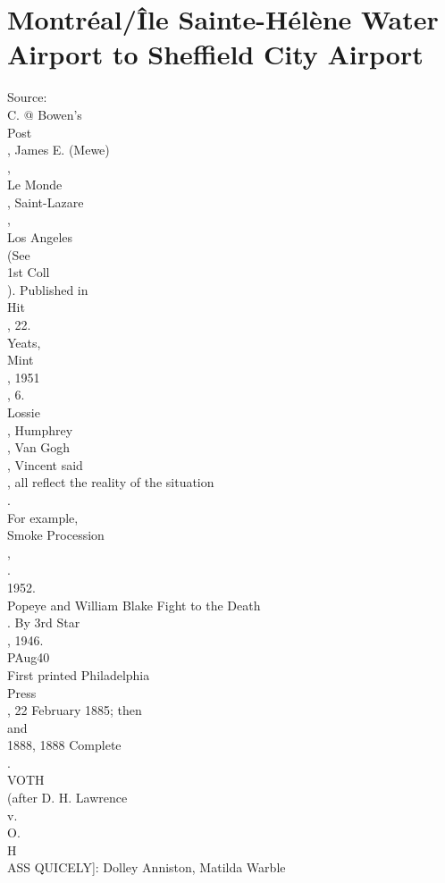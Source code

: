 \documentclass[smalldemyvopaper,11pt,twoside,onecolumn,openright,extrafontsizes]{memoir}
\begin{document}
\chapter{Montréal/Île Sainte-Hélène Water Airport to Sheffield City Airport}
Source:
\\C. @ Bowen's
\\Post
\\, James E. (Mewe)
\\,
\\Le Monde
\\, Saint-Lazare
\\,
\\Los Angeles
\\(See
\\1st Coll
\\). Published in
\\Hit
\\, 22.
\\Yeats,
\\Mint
\\, 1951
\\, 6.
\\Lossie
\\, Humphrey
\\, Van Gogh
\\, Vincent said
\\, all reflect the reality of the situation
\\.
\\For example,
\\Smoke Procession
\\,
\\.
\\1952.
\\Popeye and William Blake Fight to the Death
\\. By 3rd Star
\\, 1946.
\\PAug40
\\First printed Philadelphia
\\Press
\\, 22 February 1885; then
\\and
\\1888, 1888 Complete
\\.
\\VOTH
\\(after D. H. Lawrence
\\v.
\\O.
\\H
\\ASS QUICELY]: Dolley Anniston, Matilda Warble
\end{document}
